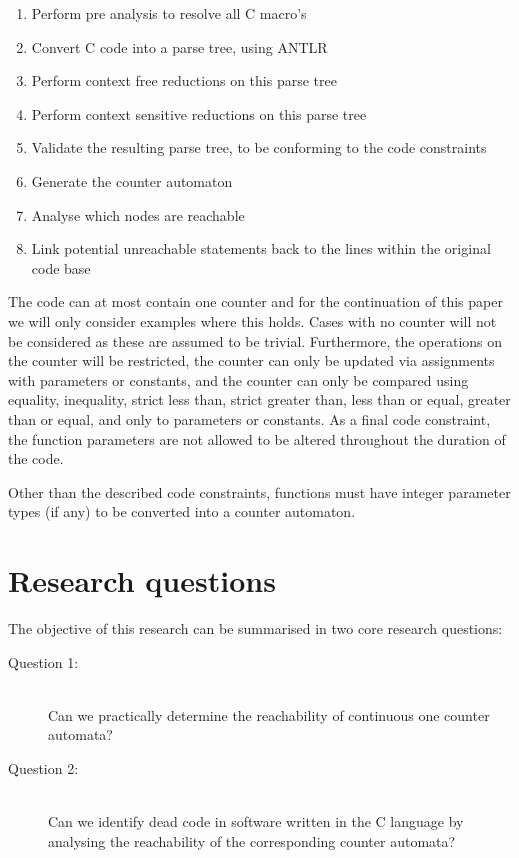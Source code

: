 \documentclass[12pt]{thesis}
\begin{document}
\begin{enumerate}
	\item Perform pre analysis to resolve all C macro's
	\item Convert C code into a parse tree, using ANTLR
	\item Perform context free reductions on this parse tree
	\item Perform context sensitive reductions on this parse tree
	\item Validate the resulting parse tree, to be conforming to the code constraints
	\item Generate the counter automaton
	\item Analyse which nodes are reachable
	\item Link potential unreachable statements back to the lines within the original code base
\end{enumerate}

The code can at most contain one counter and for the continuation of this paper we will only consider examples where this holds. Cases with no counter will not be considered as these are assumed to be trivial. Furthermore, the operations on the counter will be restricted, the counter can only be updated via assignments with parameters or constants, and the counter can only be compared using equality, inequality, strict less than, strict greater than, less than or equal, greater than or equal, and only to parameters or constants. As a final code constraint, the function parameters are not allowed to be altered throughout the duration of the code.

Other than the described code constraints, functions must have integer parameter types (if any) to be converted into a counter automaton.

\section{Research questions}
The objective of this research can be summarised in two core research questions:

\begin{description}
	\item[Question 1: ] \hfill \\ Can we practically determine the reachability of continuous one counter automata?
	\item[Question 2: ] \hfill \\ Can we identify dead code in software written in the C language by analysing the reachability of the corresponding counter automata?
\end{description}
\end{document}
